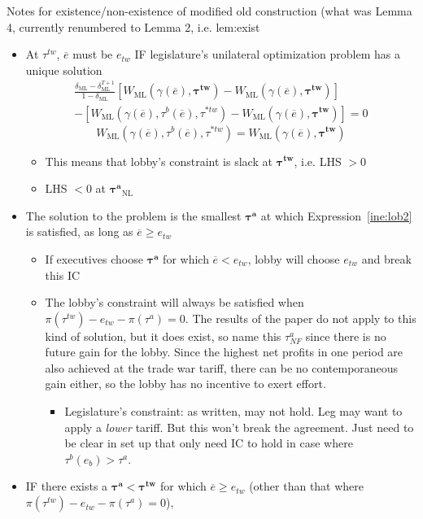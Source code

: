 \documentclass[12pt]{article}
\newcommand{\ov}{\overline}
\newcommand{\bta}{\bm{\tau^a}}
\newcommand{\btw}{\bm{\tau^{tw}}}
\newcommand{\ga}{\gamma}
\newcommand{\de}{\delta}
\begin{document}
{\newpage
Notes for existence/non-existence of modified old construction (what was Lemma 4, currently renumbered to Lemma 2, i.e. lem:exist
\begin{itemize}
	\item At $\tau^{tw}$, $\ov{e}$ must be $e_{tw}$ IF legislature's unilateral optimization problem has a unique solution
		\begin{multline*}
			\frac{\de_\text{ML} - \de_\text{ML}^{T+1}}{1-\de_\text{ML}} \left[W_\text{ML}(\ga(\ov{e}),\btw) - W_\text{ML}(\ga(\ov{e}),\btw) \right] \\
	- \left[ W_\text{ML}(\ga(\ov{e}),\tau^b(\ov{e}),\tau^{*tw}) - W_\text{ML}(\ga(\ov{e}),\btw) \right] = 0
		\end{multline*}
		\[
			W_\text{ML}(\ga(\ov{e}),\tau^b(\ov{e}),\tau^{*tw}) = W_\text{ML}(\ga(\ov{e}),\btw)
		\]
			\begin{itemize}
				\item This means that lobby's constraint is slack at $\btw$, i.e. LHS $> 0$
				\item LHS $< 0$ at $\bta_\text{NL}$
			\end{itemize}
	\item The solution to the problem is the smallest $\bta$ at which Expression~\ref{ine:lob2} is satisfied, as long as $\ov{e} \geq e_{tw}$
		\begin{itemize}
			\item If executives choose $\bta$ for which $\ov{e} < e_{tw}$, lobby will choose $e_{tw}$ and break this IC
			\item The lobby's constraint will always be satisfied when $\pi(\tau^{tw}) -e_{tw} - \pi(\tau^a) =0$. The results of the paper do not apply to this kind of solution, but it does exist, so name this $\tau^a_{NF}$ since there is no future gain for the lobby. Since the highest net profits in one period are also achieved at the trade war tariff, there can be no contemporaneous gain either, so the lobby has no incentive to exert effort.
				\begin{itemize}
					\item Legislature's constraint: as written, may not hold. Leg may want to apply a \textit{lower} tariff. But this won't break the agreement. Just need to be clear in set up that only need IC to hold in case where $\tau^b(e_b) > \tau^a$.
				\end{itemize}
		\end{itemize}
	\item IF there exists a $\bta < \btw$ for which $\ov{e} \geq e_{tw}$ (other than that where $\pi(\tau^{tw}) -e_{tw} - \pi(\tau^a) =0$),

\end{itemize}}
\end{document}
